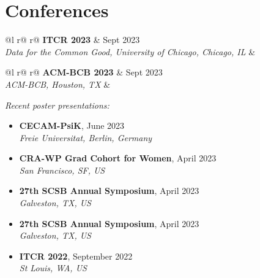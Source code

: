 \documentclass[a4paper,12pt]{article}
\begin{document}
\section{Conferences}
\begin{tabularx}{\linewidth}{ @{}l r@{} r@{} }
\textbf{ITCR 2023} & \hfill Sept 2023 \\
\textit{Data for the Common Good, University of Chicago, Chicago, IL} & \\[3.75pt]
\end{tabularx}

\begin{tabularx}{\linewidth}{ @{}l r@{} r@{} }
\textbf{ACM-BCB 2023} & \hfill Sept 2023 \\
\textit{ACM-BCB, Houston, TX} & \\[3.75pt]
\end{tabularx}

\textit{Recent poster presentations:}


\begin{itemize}
    \item \textbf{CECAM-PsiK}, June 2023 \\
    \textit{Freie Universitat, Berlin, Germany}
    \item \textbf{CRA-WP Grad Cohort for Women}, April 2023 \\
    \textit{San Francisco, SF, US}
    \item \textbf{27th SCSB Annual Symposium}, April 2023 \\
    \textit{Galveston, TX, US}
    \item \textbf{27th SCSB Annual Symposium}, April 2023 \\
    \textit{Galveston, TX, US}
    \item \textbf{ITCR 2022}, September 2022 \\
    \textit{St Louis, WA, US}
\end{itemize}
\end{document}
